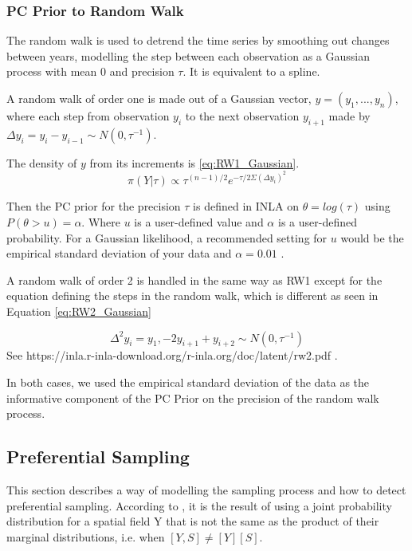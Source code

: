 \documentclass{article}
\begin{document}
\subsubsection*{PC Prior to Random Walk}
\label{subsubsec:pconranwalk}
The random walk is used to detrend the time series by smoothing out changes between years, modelling the step between each observation as a Gaussian process with mean 0 and precision $\tau$.  It is equivalent to a spline.

A random walk of order one is made out of a Gaussian vector, 
$y = (y_1, ..., y_n)$,  where each step from observation $y_i$ to the next observation $y_{i+1}$ made by $\Delta y_i = y_i - y_{i-1} \sim N(0, \tau^{-1})$.  

The density of $y$ from its increments is \ref{eq:RW1_Gaussian}.
\begin{equation} \label{eq:RW1_Gaussian}
	\pi (Y|\tau) \propto \tau^{(n-1)/2} e^{-\tau/2 \Sigma (\Delta y_i)^2} 
\end{equation}


Then the \ac{PC} prior for the precision $\tau$ is defined in \ac{INLA} on $\theta = log(\tau)$ using $P(\theta > u) = \alpha$.  Where $u$ is a user-defined value and $\alpha$ is a user-defined probability.  For a Gaussian likelihood, a recommended setting for $u$ would be the empirical standard deviation of your data and $\alpha =0.01$  \citep{gomezGitBook}.


A random walk of order 2 is handled in the same way as RW1 except for the equation defining the steps in the random walk, which is different as seen in Equation \ref{eq:RW2_Gaussian}

\begin{equation} \label{eq:RW2_Gaussian}
	\Delta^2 y_i = y_1, - 2y_{i+1} + y_{i+2} \sim N(0,\tau^{-1})
\end{equation}
See 
https://inla.r-inla-download.org/r-inla.org/doc/latent/rw2.pdf
.

In both cases, we used the empirical standard deviation of the data as the informative component of the PC Prior on the precision of the random walk process.










\subsection{Preferential Sampling} \label{subsec:PreferentialSampling}
This section describes a way of modelling the sampling process and how to detect preferential sampling. 
According to 
\citet{diggle:07}, it is the result of using a joint probability distribution for a spatial field \gls{Y} that is not the same as the product of their marginal distributions, i.e. when $[Y, S] \neq [Y][S]$.  
\end{document}
